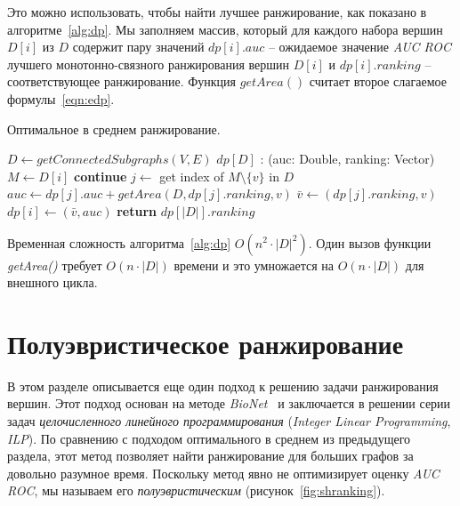 Это можно использовать, чтобы найти лучшее ранжирование, как показано
в алгоритме~\ref{alg:dp}.  Мы заполняем массив, который для каждого набора
вершин $D[i]$ из $D$ содержит пару значений $dp[i].auc$ -- ожидаемое значение
\emph{AUC ROC} лучшего монотонно-связного ранжирования вершин $D[i]$ и $dp[i].ranking$
-- соответствующее ранжирование. Функция $getArea()$ считает второе слагаемое
формулы~\eqref{eqn:edp}.

\begin{algorithm}
    \caption{Оптимальное в среднем ранжирование.}\label{alg:dp}
    \begin{algorithmic}[1]
        \State $D \gets getConnectedSubgraphs(V, E)$  
        \State $dp[D]$ : (auc: Double, ranking: Vector)
            \State $M \gets D[i]$
                    \State \textbf{continue}
                \EndIf
                \State $j \gets$  get index of $M \setminus \{v\}$ in $D$
                \State $auc \gets dp[j].auc + getArea(D, dp[j].ranking, v)$
                    \State $\bar{v} \gets (dp[j].ranking, v)$
                    \State $dp[i] \gets (\bar{v}, auc)$
                \EndIf
            \EndFor
        \EndFor
        \State \textbf{return} $dp[|D|].ranking$
        \EndProcedure
    \end{algorithmic}
\end{algorithm}

Временная сложность алгоритма~\ref{alg:dp} $O(n^2 \cdot |D|^2)$.  Один вызов
функции \emph{getArea()} требует $O(n \cdot |D|)$ времени и это умножается на
$O(n \cdot |D|)$ для внешного цикла. 





\section{Полуэвристическое ранжирование}
\label{sec_semiheuristic}

В этом разделе описывается еще один подход к решению задачи ранжирования
вершин.  Этот подход основан на методе \emph{BioNet}~\cite{Dittrich2008a}
и заключается в решении серии задач \emph{целочисленного линейного
программирования} (\emph{Integer Linear Programming}, \emph{ILP}). По сравнению
с подходом оптимального в среднем из предыдущего раздела, этот метод позволяет
найти ранжирование для больших графов за довольно разумное время.  Поскольку
метод явно не оптимизирует оценку \emph{AUC ROC}, мы называем его
\emph{полуэвристическим} (рисунок~\ref{fig:shranking}).


